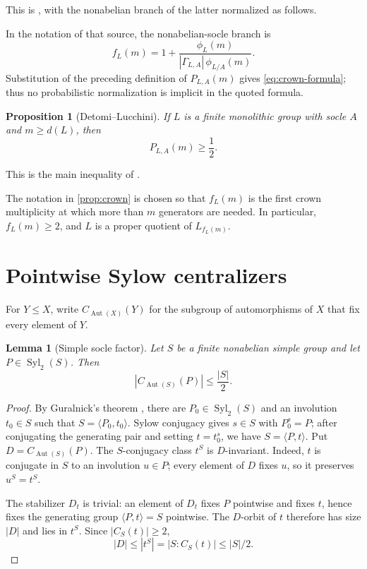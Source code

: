 \documentclass[11pt,reqno]{amsart}
\newtheorem{proposition}[theorem]{Proposition}
\newtheorem{lemma}[theorem]{Lemma}
\theoremstyle{remark}
\DeclareMathOperator{\Aut}{Aut}
\DeclareMathOperator{\Syl}{Syl}
\newcommand{\gen}[1]{\langle #1\rangle}
\newcommand{\GammaLA}{\Gamma_{L,A}}
\begin{document}
This is \cite[Theorems~1.4 and 2.7]{DallaVoltaLucchini1998}, with the
nonabelian branch of the latter normalized as follows.

In the notation of that source, the nonabelian-socle branch is
\[
 f_L(m)=1+\frac{\phi_L(m)}
 {|{\GammaLA}|\,\phi_{L/A}(m)}.
\]
Substitution of the preceding definition of $P_{L,A}(m)$ gives
\eqref{eq:crown-formula}; thus no probabilistic normalization is implicit in
the quoted formula.

\begin{proposition}[Detomi--Lucchini]\label{prop:probability}
If $L$ is a finite monolithic group with socle $A$ and $m\geq d(L)$, then
\begin{equation}\label{eq:half}
 P_{L,A}(m)\geq\frac12.
\end{equation}
\end{proposition}

This is the main inequality of \cite{DetomiLucchini2013}.

The notation in \cref{prop:crown} is chosen so that $f_L(m)$ is the first
crown multiplicity at which more than $m$ generators are needed.  In
particular, $f_L(m)\geq2$, and $L$ is a proper quotient of
$L_{f_L(m)}$.

\section{Pointwise Sylow centralizers}

For $Y\leq X$, write $C_{\Aut(X)}(Y)$ for the subgroup of automorphisms of
$X$ that fix every element of $Y$.

\begin{lemma}[Simple socle factor]\label{lem:simple-centralizer}
Let $S$ be a finite nonabelian simple group and let
$P\in\Syl_2(S)$.  Then
\begin{equation}\label{eq:simple-centralizer}
 |C_{\Aut(S)}(P)|\leq \frac{|S|}{2}.
\end{equation}
\end{lemma}

\begin{proof}
By Guralnick's theorem \cite{Guralnick1986}, there are
$P_0\in\Syl_2(S)$ and an involution $t_0\in S$ such that
$S=\gen{P_0,t_0}$.  Sylow conjugacy gives $s\in S$ with $P_0^s=P$;
after conjugating the generating pair and setting $t=t_0^s$, we have
$S=\gen{P,t}$.  Put $D=C_{\Aut(S)}(P)$.  The $S$-conjugacy class
$t^S$ is $D$-invariant.  Indeed, $t$ is conjugate in $S$ to an involution
$u\in P$; every element of $D$ fixes $u$, so it preserves $u^S=t^S$.

The stabilizer $D_t$ is trivial: an element of $D_t$ fixes $P$ pointwise and
fixes $t$, hence fixes the generating group $\gen{P,t}=S$ pointwise.  The
$D$-orbit of $t$ therefore has size $|D|$ and lies in $t^S$.  Since
$\lvert C_S(t)\rvert\geq2$,
\[
 |D|\leq |t^S|=\lvert S:C_S(t)\rvert\leq |S|/2.
\]
\end{proof}
\end{document}
